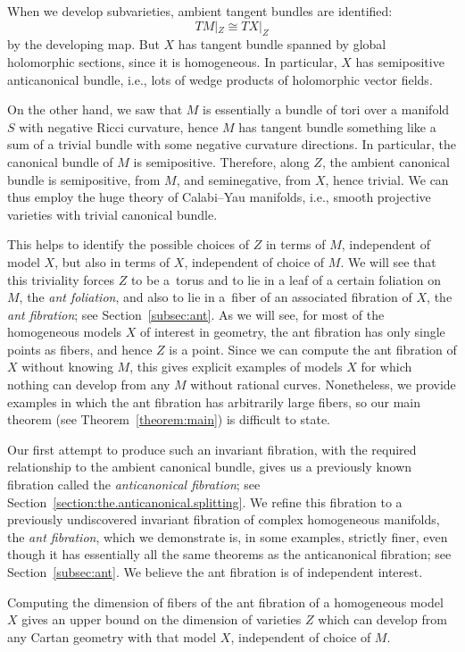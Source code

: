 \documentclass[pdftex]{sigma}
\numberwithin{equation}{section}
\begin{document}
When we develop subvarieties, ambient tangent bundles are identified:
\[
 TM|_Z \cong TX|_Z
\]
by the developing map.
But $X$ has tangent bundle spanned by global holomorphic sections, since it is homogeneous.
In particular, $X$ has semipositive anticanonical bundle, i.e., lots of wedge products of holomorphic vector fields.

On the other hand, we saw that $M$ is essentially a bundle of tori over a manifold $S$ with negative Ricci curvature,
hence $M$ has tangent bundle something like a sum of a trivial bundle with some negative curvature directions.
In particular, the canonical bundle of $M$ is semipositive.
Therefore, along $Z$, the ambient canonical bundle is semipositive, from $M$, and seminegative, from $X$, hence trivial.
We can thus employ the huge theory of Calabi--Yau manifolds, i.e., smooth projective varieties with trivial canonical bundle.

This helps to identify the possible choices of $Z$ in terms of $M$, independent of model $X$, but also in terms of $X$,
independent of choice of $M$. We will see that this triviality forces $Z$ to be a~torus and to lie in a leaf of a certain foliation on
$M$, the \emph{ant foliation}, and also to lie in a~fiber of an associated fibration of $X$, the \emph{ant fibration}; see
Section~\ref{subsec:ant}. As we will see, for most of the homogeneous models $X$ of interest in geometry, the ant fibration has only
single points as fibers, and hence $Z$ is a point. Since we can compute the ant fibration of $X$ without knowing $M$, this gives explicit
examples of models $X$ for which nothing can develop from any $M$ without rational curves. Nonetheless, we provide examples in which
the ant fibration has arbitrarily large fibers, so our main theorem (see Theorem~\ref{theorem:main}) is difficult to state.

Our first attempt to produce such an invariant fibration, with the required relationship to the ambient canonical bundle, gives us a
previously known fibration called the \emph{anticanonical fibration}; see Section~\ref{section:the.anticanonical.splitting}. We refine
this fibration to a previously undiscovered invariant fibration of complex homogeneous manifolds, the \emph{ant fibration}, which we
demonstrate is, in some examples, strictly finer, even though it has essentially all the same theorems as the anticanonical fibration; see
Section~\ref{subsec:ant}. We believe the ant fibration is of independent interest.

Computing the dimension of fibers of the ant fibration of a homogeneous model $X$ gives an upper bound on the dimension of varieties
$Z$ which can develop from any Cartan geometry with that model $X$, independent of choice of $M$.
\end{document}
